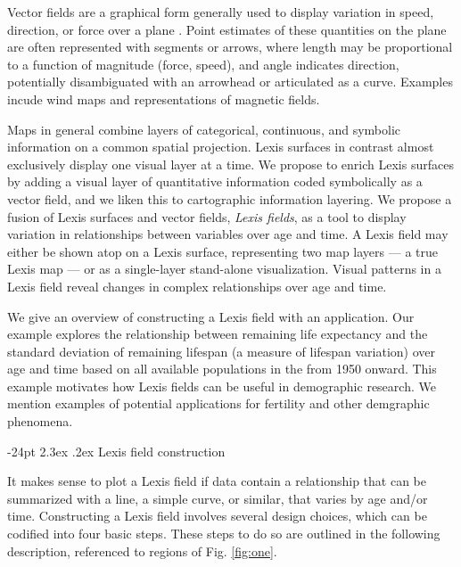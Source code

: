 \documentclass[10pt, twoside, parskip=half]{article}
\makeatletter
\renewcommand\section{\@startsection {section}{1}{\z@}%
                                   {-24pt}%
                                   {2.3ex \@plus.2ex}%
                                   {\normalfont\large\bfseries}}
\makeatother
\begin{document}
Vector fields are a graphical form generally used to display variation in speed, direction, or force over a plane \citep{weiskopf2007vector}. Point estimates of these quantities on the plane are often represented with segments or arrows, where length may be proportional to a function of magnitude (force, speed), and angle indicates direction, potentially disambiguated with an arrowhead or articulated as a curve. Examples incude wind maps and representations of magnetic fields.

Maps in general combine layers of categorical, continuous, and symbolic information on a common spatial projection. Lexis surfaces in contrast almost exclusively display one visual layer at a time. We propose to enrich Lexis surfaces by adding a visual layer of quantitative information coded symbolically as a vector field, and we liken this to cartographic information layering. We propose a fusion of Lexis surfaces and vector fields, \emph{Lexis fields}, as a tool to display variation in relationships between variables over age and time. A Lexis field may either be shown atop on a Lexis surface, representing two map layers --- a true Lexis map --- or as a single-layer stand-alone visualization. Visual patterns in a Lexis field reveal changes in complex relationships over age and time.

We give an overview of constructing a Lexis field with an application. Our example explores the relationship between remaining life expectancy and the standard deviation of remaining lifespan (a measure of lifespan variation) over age and time based on all available populations in the \citet{HMD} from 1950 onward. This example motivates how Lexis fields can be useful in demographic research. We mention examples of potential applications for fertility and other demgraphic phenomena.

\hypertarget{lexis-field-construction}{%
\section{Lexis field construction}\label{lexis-field-construction}}

It makes sense to plot a Lexis field if data contain a relationship that can be summarized with a line, a simple curve, or similar, that varies by age and/or time. Constructing a Lexis field involves several design choices, which can be codified into four basic steps. These steps to do so are outlined in the following description, referenced to regions of Fig. \ref{fig:one}.
\end{document}
